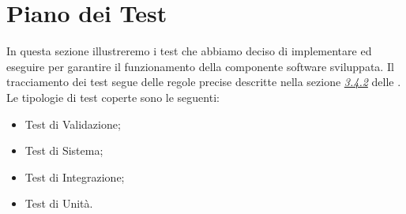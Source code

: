 \section{Piano dei Test}

In questa sezione illustreremo i test che abbiamo deciso di implementare ed eseguire per garantire il funzionamento della componente software sviluppata. Il tracciamento dei test segue delle regole precise descritte nella sezione \textit{\underline{3.4.2}} delle \NdP. \newline
Le tipologie di test coperte sono le seguenti:
\begin{itemize}
    \item Test di Validazione;
    \item Test di Sistema;
    \item Test di Integrazione;
    \item Test di Unità. \newline
\end{itemize}
\newpage

\clearpage

\newpage

\newpage
